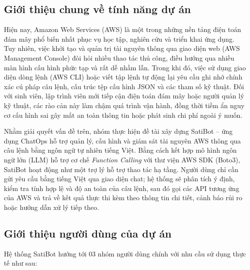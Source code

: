 \documentclass[a4paper,12pt]{article}
\begin{document}
\subsection{Giới thiệu chung về tính năng dự án}

Hiện nay, Amazon Web Services (AWS) là một trong những nền tảng điện toán đám mây phổ biến nhất phục vụ học tập, nghiên cứu và triển khai ứng dụng. Tuy nhiên, việc khởi tạo và quản trị tài nguyên thông qua giao diện web (AWS Management Console) đòi hỏi nhiều thao tác thủ công, điều hướng qua nhiều màn hình cấu hình phức tạp và rất dễ nhầm lẫn. Trong khi đó, việc sử dụng giao diện dòng lệnh (AWS CLI) hoặc viết tập lệnh tự động lại yêu cầu ghi nhớ chính xác cú pháp câu lệnh, cấu trúc tệp cấu hình JSON và các tham số kỹ thuật. Đối với sinh viên, lập trình viên mới tiếp cận điện toán đám mây hoặc người quản lý kỹ thuật, các rào cản này làm chậm quá trình vận hành, đồng thời tiềm ẩn nguy cơ cấu hình sai gây mất an toàn thông tin hoặc phát sinh chi phí ngoài ý muốn.

Nhằm giải quyết vấn đề trên, nhóm thực hiện đề tài xây dựng SatiBot -- ứng dụng ChatOps hỗ trợ quản lý, cấu hình và giám sát tài nguyên AWS thông qua câu lệnh bằng ngôn ngữ tự nhiên tiếng Việt. Bằng cách kết hợp mô hình ngôn ngữ lớn (LLM) hỗ trợ cơ chế \textit{Function Calling} với thư viện AWS SDK (Boto3), SatiBot hoạt động như một trợ lý hỗ trợ thao tác hạ tầng. Người dùng chỉ cần gửi yêu cầu bằng tiếng Việt qua giao diện chat; hệ thống sẽ phân tích ý định, kiểm tra tính hợp lệ và độ an toàn của câu lệnh, sau đó gọi các API tương ứng của AWS và trả về kết quả thực thi kèm theo thông tin chi tiết, cảnh báo rủi ro hoặc hướng dẫn xử lý tiếp theo.

\subsection{Giới thiệu người dùng của dự án}

Hệ thống SatiBot hướng tới 03 nhóm người dùng chính với nhu cầu sử dụng thực tế như sau:
\end{document}
